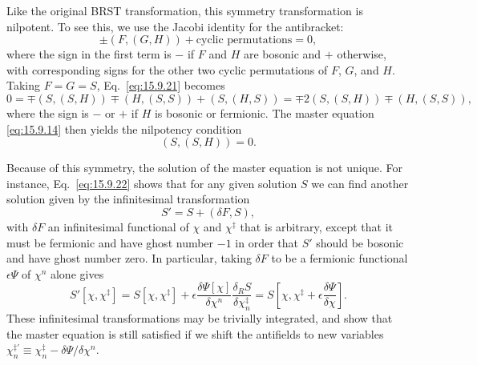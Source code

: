 Like the original BRST transformation, this symmetry transformation is
nilpotent. To see this, we use the Jacobi identity for the antibracket:
\begin{equation}
\pm(F,(G,H))+\text{cyclic permutations}=0,
\tag{15.9.21}\label{eq:15.9.21}
\end{equation}
where the sign in the first term is $-$ if $F$ and $H$ are bosonic and $+$
otherwise, with corresponding signs for the other two cyclic permutations of
$F$, $G$, and $H$. Taking $F=G=S$, Eq.~\eqref{eq:15.9.21} becomes
\[
0=\mp(S,(S,H))\mp(H,(S,S))+(S,(H,S))
=\mp2(S,(S,H))\mp(H,(S,S)),
\]
where the sign is $-$ or $+$ if $H$ is bosonic or fermionic. The master
equation \eqref{eq:15.9.14} then yields the nilpotency condition
\begin{equation}
(S,(S,H))=0.
\tag{15.9.22}\label{eq:15.9.22}
\end{equation}

Because of this symmetry, the solution of the master equation is not unique.
For instance, Eq.~\eqref{eq:15.9.22} shows that for any given solution $S$ we
can find another solution given by the infinitesimal transformation
\begin{equation}
S'=S+(\delta F,S),
\tag{15.9.23}\label{eq:15.9.23}
\end{equation}
with $\delta F$ an infinitesimal functional of $\chi$ and $\chi^{\ddagger}$
that is arbitrary, except that it must be fermionic and have ghost number
$-1$ in order that $S'$ should be bosonic and have ghost number zero. In
particular, taking $\delta F$ to be a fermionic functional
$\epsilon\Psi$ of $\chi^n$ alone gives
\begin{equation}
S'[\chi,\chi^{\ddagger}]
=S[\chi,\chi^{\ddagger}]
+\epsilon\frac{\delta\Psi[\chi]}{\delta\chi^n}
 \frac{\delta_R S}{\delta\chi_n^{\ddagger}}
=S\left[\chi,\chi^{\ddagger}
+\epsilon\frac{\delta\Psi}{\delta\chi}\right].
\tag{15.9.24}\label{eq:15.9.24}
\end{equation}
These infinitesimal transformations may be trivially integrated, and show
that the master equation is still satisfied if we shift the antifields to new
variables
$\chi_n^{\ddagger\prime}\equiv
\chi_n^{\ddagger}-\delta\Psi/\delta\chi^n$.

